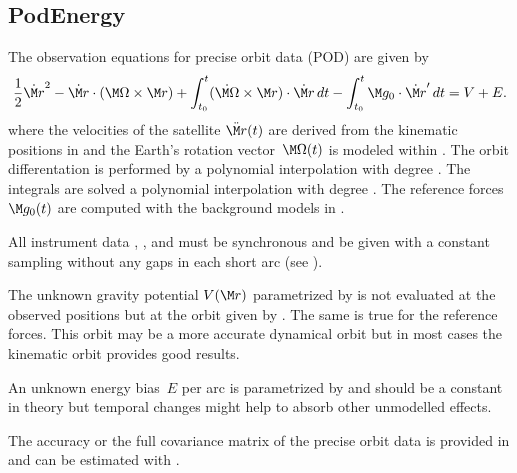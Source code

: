 \subsection{PodEnergy}\label{observationType:podEnergy}
The observation equations for precise orbit data (POD) are given by
\begin{equation}
  \frac{1}{2}\dot{\M r}^2
  -\dot{\M r} \cdot (\M\Omega\times\M r)
  +\int_{t_0}^t(\dot{\M\Omega}\times\M r)\cdot \dot{\M r}\,dt
  - \int_{t_0}^t \M g_0 \cdot\dot{\M r}'\,dt
  = V + E.
\end{equation}
where the velocities of the satellite $\ddot{\M r}(t)$ are derived from
the kinematic positions in  and the Earth's rotation vector~$\M\Omega(t)$ is modeled
within . The orbit differentation is
performed by a polynomial interpolation with degree .
The integrals are solved a polynomial interpolation with degree .
The reference forces $\M g_0(t)$ are computed with the background models in .

All instrument data , , and 
must be synchronous and be given with a constant sampling without any gaps in each short arc
(see ).

The unknown gravity potential $V(\M r)$ parametrized by 
is not evaluated at the observed positions but at the orbit given by .
The same is true for the reference forces. This orbit may be a more accurate dynamical orbit but
in most cases the kinematic orbit provides good results.

An unknown energy bias~$E$ per arc is parametrized by 
and should be a constant in theory but temporal changes might help to absorb other unmodelled effects.

The accuracy or the full covariance matrix of the precise orbit data is provided in
 and can be estimated with .


